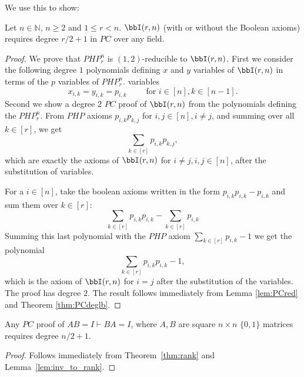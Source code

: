 We use this to show:

\begin{theorem} \label{thm:rank}
Let $n\in \mathbb N$,  $n\geq 2$ and $1\leq r<n$. $\bbI(r,n)$ (with or without the Boolean axioms) requires degree $r/2+1$ in $PC$ over any field.
\end{theorem}
\begin{proof}
We prove that $PHP^n_{r}$ is $(1,2)$-reducible to $\bbI(r,n)$. 
First we consider the following degree $1$  polynomials  defining $x$ and $y$ variables of $\bbI(r,n)$ 
in terms of the $p$ variables of $PHP^n_{r}$.
variables 
$$
x_{i,k} = y_{i,k} = p_{i,k} \qquad \mbox{ for } i \in [n], k \in [n-1].
$$ 
Second we show a degree $2$ $PC$ proof   of $\bbI(r,n)$ from the  polynomials defining the  $PHP^n_r$.
From $PHP$ axioms $p_{i,k}p_{k,j}$ for $i,j \in [n], i\not =j$,  and summing over all $k \in [r]$, we get 
$$
\sum_{k \in [r]}p_{i,k}p_{k,j},
$$ 
which are exactly the axioms of $\bbI(r,n)$ for $i \not =j, i,j \in [n]$, after the substitution of variables.

For a $i\in [n]$, take  the boolean axioms written in the form $p_{i,k}p_{i,k}-p_{i,k}$ and  sum them over $k \in [r]$:
$$\sum_{k \in [r]} p_{i,k}p_{i,k} - \sum_{k \in [r]}p_{i,k}$$
Summing this last polynomial with the $PHP$ axiom $\sum_{k \in [r]} p_{i,k} -1$
we get the polynomial
$$\sum_{k\in [r]}p_{i,k}p_{i,k} -1,$$
which is the axiom of $\bbI(r,n)$ for $i=j$ after the substitution of the  variables.  The proof has degree $2$. 
The result follows immediately  from Lemma \ref{lem:PCred} and Theorem \ref{thm:PCdeglb}. 

\end{proof}

\begin{corollary}
Any $PC$ proof of $AB=I \vdash BA=I$, where $A,B$ are square $n\times n$ $\{0,1\}$ matrices requires degree $n/2+1$.
\end{corollary}

\begin{proof}
Follows immediately from Theorem~\ref{thm:rank} and Lemma~\ref{lem:inv_to_rank}.
\end{proof}
